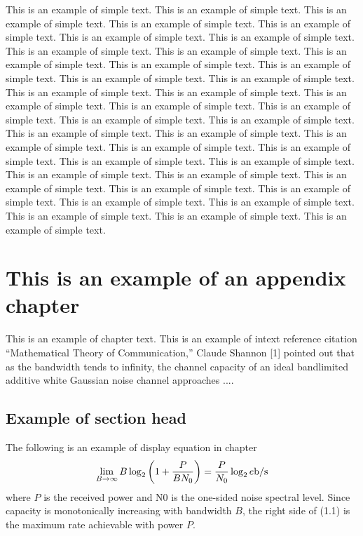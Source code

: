 \documentclass[11pt]{now}
\begin{document}
                   This is an example of simple text. This is an
example of simple text.  This is an example of simple text. This is
an example of simple text.  This is an example of simple text. This
is an example of simple text.  This is an example of simple text.
This is an example of simple text.  This is an example of simple
text. This is an example of simple text.  This is an example of
simple text. This is an example of simple text.  This is an example
of simple text. This is an example of simple text.  This is an
example of simple text. This is an example of simple text.  This is
an example of simple text. This is an example of simple text.  This
is an example of simple text. This is an example of simple text.
This is an example of simple text. This is an example of simple text.
This is an example of simple text. This is an example of simple text.
This is an example of simple text. This is an example of simple text.
This is an example of simple text. This is an example of simple text.
This is an example of simple text. This is an example of simple text.
This is an example of simple text. This is an example of simple text.
This is an example of simple text. This is an example of simple text.
This is an example of simple text. This is an example of simple text.
This is an example of simple text. This is an example of simple text.

\appendix
\chapter{This is an example of an appendix chapter}

This is an example of chapter text. This is an example of intext reference citation ``Mathematical Theory of Communication,'' Claude Shannon [1] pointed out that as the bandwidth tends to infinity, the
channel capacity of an ideal bandlimited additive white Gaussian
noise channel approaches ....

\section{Example of section head}

The following is an example of display equation in chapter
\begin{equation}
\lim_{B\rightarrow \infty} B \log_2 \left(1 + \frac{P}{BN_0}\right) =
\frac{P}{N_0}\log_2 e {\rm b/s}
\end{equation}
where $P$ is the received power and N0 is the one-sided noise spectral
level. Since capacity is monotonically increasing with bandwidth $B$,
the right side of (1.1) is the maximum rate achievable with power $P$.
\end{document}
